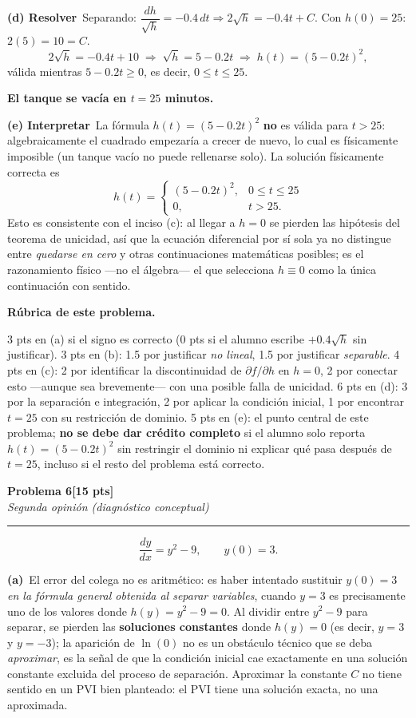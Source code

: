 \documentclass[11pt,letterpaper]{article}
\newcommand{\problema}[3]{%
  \bigskip\bigskip\noindent
  {\Large\textbf{Problema #1}}\hfill\textbf{[#2 pts]}\\[3pt]
  {\small\itshape #3}\par
  \vspace{2pt}\hrule\vspace{8pt}
}
\newcommand{\subparte}[2]{%
  \medskip\noindent\textbf{(#1}\ #2\par\smallskip
}
\newenvironment{resultado}
  {\begin{mdframed}[linecolor=black,linewidth=0.6pt,
    innerleftmargin=6pt,innerrightmargin=6pt,innertopmargin=4pt,innerbottommargin=4pt]
   \bfseries}
  {\end{mdframed}}
\newenvironment{rubrica}{%
  \begin{mdframed}[linecolor=black,linewidth=0.6pt,
    innerleftmargin=8pt,innerrightmargin=8pt,innertopmargin=5pt,innerbottommargin=5pt]
  \small\textbf{Rúbrica de este problema.}\par\smallskip
}{\end{mdframed}}
\begin{document}
\subparte{d) Resolver}{Separando: $\dfrac{dh}{\sqrt h} = -0.4\,dt \Rightarrow 2\sqrt h = -0.4t + C$. Con $h(0)=25$: $2(5)=10=C$.
\[
2\sqrt{h} = -0.4t + 10 \;\Longrightarrow\; \sqrt{h} = 5-0.2t \;\Longrightarrow\; h(t) = (5-0.2t)^2,
\]
válida mientras $5-0.2t \geq 0$, es decir, $0\le t\le 25$.
\begin{resultado}
El tanque se vacía en $t=25$ minutos.
\end{resultado}}

\subparte{e) Interpretar}{La fórmula $h(t)=(5-0.2t)^2$ \textbf{no} es válida para $t>25$: algebraicamente el cuadrado empezaría a crecer de nuevo, lo cual es físicamente imposible (un tanque vacío no puede rellenarse solo). La solución físicamente correcta es
\[
h(t) = \begin{cases} (5-0.2t)^2, & 0 \le t \le 25 \\ 0, & t > 25. \end{cases}
\]
Esto es consistente con el inciso (c): al llegar a $h=0$ se pierden las hipótesis del teorema de unicidad, así que la ecuación diferencial por sí sola ya no distingue entre \emph{quedarse en cero} y otras continuaciones matemáticas posibles; es el razonamiento físico —no el álgebra— el que selecciona $h\equiv0$ como la única continuación con sentido.}

\begin{rubrica}
3 pts en (a) si el signo es correcto (0 pts si el alumno escribe $+0.4\sqrt h$ sin justificar). 3 pts en (b): 1.5 por justificar \emph{no lineal}, 1.5 por justificar \emph{separable}. 4 pts en (c): 2 por identificar la discontinuidad de $\partial f/\partial h$ en $h=0$, 2 por conectar esto —aunque sea brevemente— con una posible falla de unicidad. 6 pts en (d): 3 por la separación e integración, 2 por aplicar la condición inicial, 1 por encontrar $t=25$ con su restricción de dominio. 5 pts en (e): el punto central de este problema; \textbf{no se debe dar crédito completo} si el alumno solo reporta $h(t)=(5-0.2t)^2$ sin restringir el dominio ni explicar qué pasa después de $t=25$, incluso si el resto del problema está correcto.
\end{rubrica}

\newpage
\problema{6}{15}{Segunda opinión (diagnóstico conceptual)}

\[
\frac{dy}{dx} = y^2-9, \qquad y(0)=3.
\]

\subparte{a)}{El error del colega no es aritmético: es haber intentado sustituir $y(0)=3$ \emph{en la fórmula general obtenida al separar variables}, cuando $y=3$ es precisamente uno de los valores donde $h(y)=y^2-9=0$. Al dividir entre $y^2-9$ para separar, se pierden las \textbf{soluciones constantes} donde $h(y)=0$ (es decir, $y=3$ y $y=-3$); la aparición de $\ln(0)$ no es un obstáculo técnico que se deba \emph{aproximar}, es la señal de que la condición inicial cae exactamente en una solución constante excluida del proceso de separación. Aproximar la constante $C$ no tiene sentido en un PVI bien planteado: el PVI tiene una solución exacta, no una aproximada.}
\end{document}

